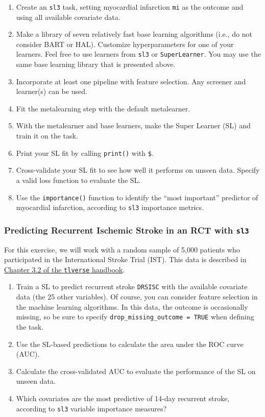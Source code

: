 \documentclass[12pt, krantz2,]{krantz}
\providecommand{\tightlist}{%
  \setlength{\itemsep}{0pt}\setlength{\parskip}{0pt}}
\theoremstyle{definition}
\theoremstyle{definition}
\theoremstyle{definition}
\newcommand{\1}{\mathbbm{1}}
\begin{document}
\begin{enumerate}
\def\labelenumi{\arabic{enumi}.}
\tightlist
\item
  Create an \texttt{sl3} task, setting myocardial infarction \texttt{mi} as the outcome and
  using all available covariate data.
\item
  Make a library of seven relatively fast base learning algorithms (i.e., do
  not consider BART or HAL). Customize hyperparameters for one of your
  learners. Feel free to use learners from \texttt{sl3} or \texttt{SuperLearner}. You may
  use the same base learning library that is presented above.
\item
  Incorporate at least one pipeline with feature selection. Any screener and
  learner(s) can be used.
\item
  Fit the metalearning step with the default metalearner.
\item
  With the metalearner and base learners, make the Super Learner (SL) and
  train it on the task.
\item
  Print your SL fit by calling \texttt{print()} with \texttt{\$}.
\item
  Cross-validate your SL fit to see how well it performs on unseen
  data. Specify a valid loss function to evaluate the SL.
\item
  Use the \texttt{importance()} function to identify the ``most important'' predictor of
  myocardial infarction, according to \texttt{sl3} importance metrics.
\end{enumerate}

\hypertarget{sl3ex2}{%
\subsubsection{\texorpdfstring{Predicting Recurrent Ischemic Stroke in an RCT with \texttt{sl3}}{Predicting Recurrent Ischemic Stroke in an RCT with sl3}}\label{sl3ex2}}

For this exercise, we will work with a random sample of 5,000 patients who
participated in the International Stroke Trial (IST). This data is described in
\href{https://tlverse.org/tlverse-handbook/data.html\#ist}{Chapter 3.2 of the \texttt{tlverse}
handbook}.

\begin{enumerate}
\def\labelenumi{\arabic{enumi}.}
\tightlist
\item
  Train a SL to predict recurrent stroke \texttt{DRSISC} with the available covariate
  data (the 25 other variables). Of course, you can consider feature selection
  in the machine learning algorithms. In this data, the outcome is
  occasionally missing, so be sure to specify \texttt{drop\_missing\_outcome\ =\ TRUE}
  when defining the task.
\item
  Use the SL-based predictions to calculate the area under the ROC curve
  (AUC).
\item
  Calculate the cross-validated AUC to evaluate the performance of the
  SL on unseen data.
\item
  Which covariates are the most predictive of 14-day recurrent stroke,
  according to \texttt{sl3} variable importance measures?
\end{enumerate}
\end{document}
